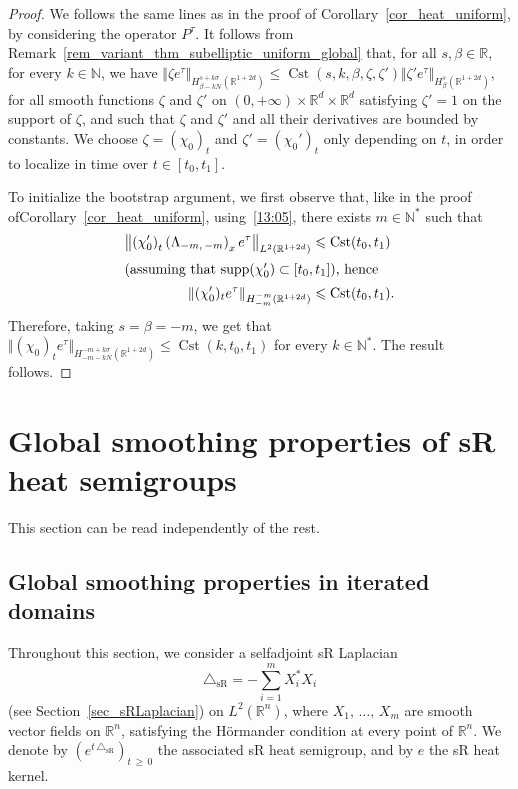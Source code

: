 \documentclass[AHL,Unicode,published]{cedram}
\newcommand*\R{\mathbb{R}}
\newcommand*\N{\mathbb{N}}
\DeclareMathOperator{\supp}{supp}
\DeclareMathOperator{\Cst}{Cst}
\newcommand{\trianglesR}{\triangle_{\mathrm{sR}}}
\renewcommand{\geq}{\geqslant}
\renewcommand{\leq}{\leqslant}
\begin{document}
\begin{proof}
We follows the same lines as in the proof of Corollary~\ref{cor_heat_uniform}, by considering the operator $P^\tau$. It follows from Remark~\ref{rem_variant_thm_subelliptic_uniform_global} that, for all $s,\beta\in\R$, for every $k\in\N$, we have $\Vert \zeta e^\tau\Vert_{H^{s+k\sigma}_{\beta-kN}(\R^{1+2d})} \leq \Cst(s,k,\beta,\zeta,\zeta') \Vert \zeta' e^\tau\Vert_{H^{s}_\beta(\R^{1+2d})}$, for all smooth functions $\zeta$ and $\zeta'$ on $(0,+\infty)\times\R^d\times\R^d$ satisfying $\zeta'=1$ on the support of $\zeta$, and such that $\zeta$ and $\zeta'$ and all their derivatives are bounded by constants. We choose $\zeta=(\chi_0)_t$ and $\zeta'=(\chi_0')_t$ only depending on $t$, in order to localize in time over $t\in[t_0,t_1]$.

To initialize the bootstrap argument, we first observe that, like in the proof of\linebreak Corollary~\ref{cor_heat_uniform}, using~\eqref{13:05}, there exists $m\in\N^*$ such that
\begin{align*}
\left\Vert \left(\chi_0'\right)_t \left(\Lambda_{-m,\,-m}\right)_x e^\tau\right\Vert_{L^2\left(\R^{1+2d}\right)}&\leq\Cst(t_0,t_1)
\\
\intertext{(assuming that $\supp(\chi_0')\subset[t_0,t_1]$), hence}
\left\Vert (\chi_0')_t e^\tau\right\Vert_{H^{-m}_{-m}\left(\R^{1+2d}\right)}&\leq\Cst(t_0,t_1).
\end{align*}
Therefore, taking $s=\beta=-m$, we get that $\Vert (\chi_0)_t e^\tau\Vert_{H^{-m+k\sigma}_{-m-kN}(\R^{1+2d})}\leq \Cst(k,t_0,t_1)$ for every $k\in\N^*$. The result follows.
\end{proof}

\vspace{5em}
\goodbreak

\section{Global smoothing properties of sR heat semigroups}\label{sec:global_sR}
This section can be read independently of the rest.

\subsection{Global smoothing properties in iterated domains}\label{sec:global_estimates_sR}
Throughout this section, we consider a selfadjoint sR Laplacian
\[
\trianglesR=-\sum_{i=1}^mX_i^*X_i
\]
(see Section~\ref{sec_sRLaplacian}) on $L^2(\R^n)$, where $X_1,\,\ldots,\,X_m$ are smooth vector fields on $\R^n$, satisfying the H\"ormander condition at every point of $\R^n$. We denote by $(e^{t\,\trianglesR})_{t\,\geq\,0}$ the associated sR heat semigroup, and by $e$ the sR heat kernel.
\end{document}
